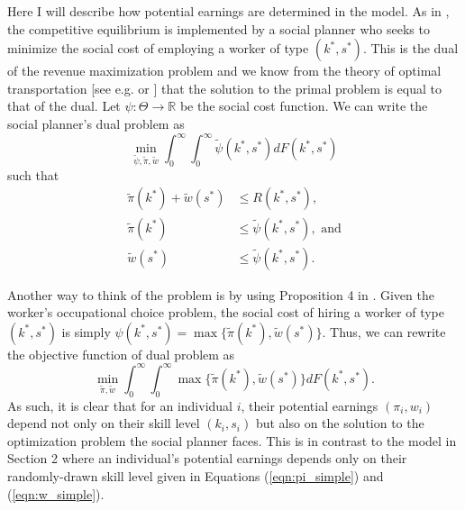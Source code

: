 \documentclass[12 pt]{article}
\begin{document}
Here I will describe how potential earnings are determined in the model. As in \citet{mak2025occupational}, the competitive equilibrium is implemented by a social planner who seeks to minimize the social cost of employing a worker of type $(k^*,s^*)$. This is the dual of the revenue maximization problem and we know from the theory of optimal transportation [see e.g. \citet{mccann2010optimal} or \citet{galichon2018optimal}] that the solution to the primal problem is equal to that of the dual. Let $\psi:\Theta \to \mathbb{R}$ be the social cost function. We can write the social planner's dual problem as
\begin{equation*}
	\min_{\tilde{\psi},\tilde{\pi},\tilde{w}} \int_0^\infty \int_0^\infty \tilde{\psi}(k^*,s^*) dF(k^*,s^*)
\end{equation*}
such that
\begin{align*}
	\tilde{\pi}(k^*) + \tilde{w}(s^*) &\leq R(k^*,s^*),\\
	\tilde{\pi}(k^*) &\leq \tilde{\psi}(k^*,s^*), \text{ and}\\
   \tilde{w}(s^*) &\leq\tilde{\psi}(k^*,s^*).
\end{align*}

Another way to think of the problem is by using Proposition 4 in \citet{mak2025occupational}. Given the worker's occupational choice problem, the social cost of hiring a worker of type $(k^*,s^*)$ is simply $\psi(k^*,s^*) = \max\{\tilde{\pi}(k^*),\tilde{w}(s^*)\}$. Thus, we can rewrite the objective function of dual problem as
\begin{equation}
	\min_{\tilde{\pi},\tilde{w}} \int_0^\infty \int_0^\infty \max\{\tilde{\pi}(k^*),\tilde{w}(s^*)\} dF(k^*,s^*).
	\label{eqn:spp}
\end{equation}
As such, it is clear that for an individual $i$, their potential earnings $(\pi_i,w_i)$ depend not only on their skill level $(k_i,s_i)$ but also on the solution to the optimization problem the social planner faces. This is in contrast to the model in Section 2 where an individual's potential earnings depends only on their randomly-drawn skill level given in Equations (\ref{eqn:pi_simple}) and (\ref{eqn:w_simple}).
\end{document}
